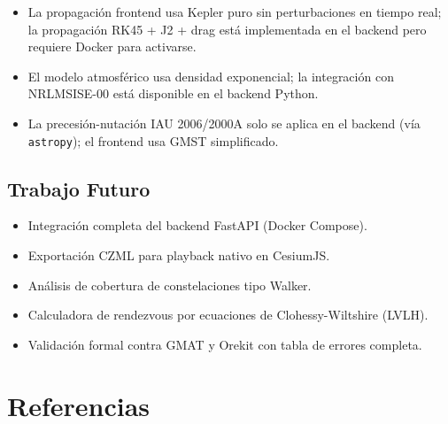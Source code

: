 \documentclass[12pt,a4paper]{article}
\newcommand{\code}[1]{\texttt{\small #1}}
\begin{document}
\begin{itemize}
  \item La propagaci\'on frontend usa Kepler puro sin perturbaciones en tiempo real; la propagaci\'on RK45 + J2 + drag est\'a implementada en el backend pero requiere Docker para activarse.
  \item El modelo atmosf\'erico usa densidad exponencial; la integraci\'on con NRLMSISE-00 est\'a disponible en el backend Python.
  \item La precesi\'on-nutaci\'on IAU 2006/2000A solo se aplica en el backend (v\'ia \code{astropy}); el frontend usa GMST simplificado.
\end{itemize}

\subsection{Trabajo Futuro}

\begin{itemize}
  \item Integraci\'on completa del backend FastAPI (Docker Compose).
  \item Exportaci\'on CZML para playback nativo en CesiumJS.
  \item An\'alisis de cobertura de constelaciones tipo Walker.
  \item Calculadora de rendezvous por ecuaciones de Clohessy-Wiltshire (LVLH).
  \item Validaci\'on formal contra GMAT y Orekit con tabla de errores completa.
\end{itemize}

\section*{Referencias}
\end{document}
